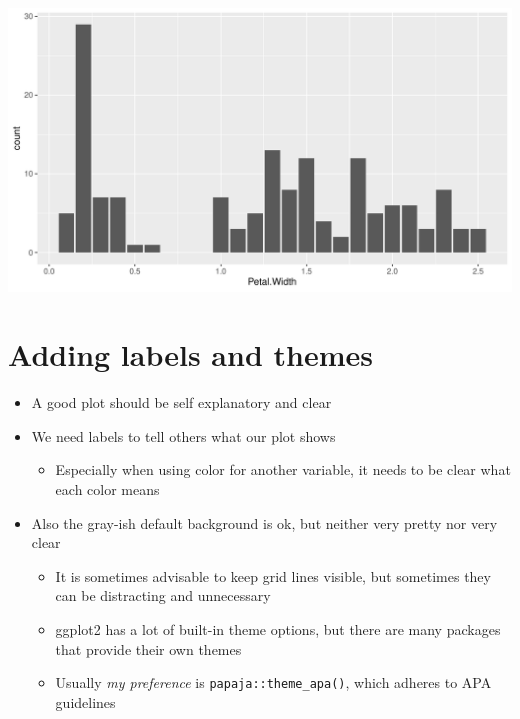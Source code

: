 \documentclass[
]{book}
\providecommand{\tightlist}{%
  \setlength{\itemsep}{0pt}\setlength{\parskip}{0pt}}
\begin{document}
\begin{flushleft}\includegraphics{_main_files/figure-latex/unnamed-chunk-48-1} \end{flushleft}

\section{Adding labels and themes}\label{adding-labels-and-themes}

\begin{itemize}
\tightlist
\item
  A good plot should be self explanatory and clear
\item
  We need labels to tell others what our plot shows

  \begin{itemize}
  \tightlist
  \item
    Especially when using color for another variable, it needs to be clear what each color means
  \end{itemize}
\item
  Also the gray-ish default background is ok, but neither very pretty nor very clear

  \begin{itemize}
  \tightlist
  \item
    It is sometimes advisable to keep grid lines visible, but sometimes they can be distracting and unnecessary
  \item
    ggplot2 has a lot of built-in theme options, but there are many packages that provide their own themes
  \item
    Usually \emph{my preference} is \texttt{papaja::theme\_apa()}, which adheres to APA guidelines
  \end{itemize}
\end{itemize}
\end{document}
